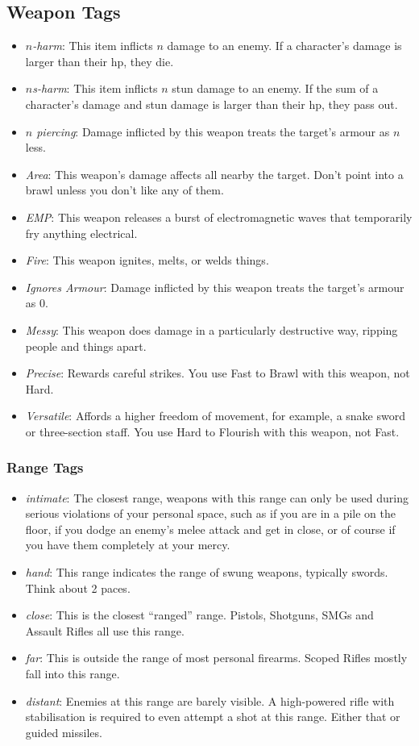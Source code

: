 \subsection{Weapon Tags}
\begin{itemize}
\item \textit{$n$-harm}: This item inflicts $n$ damage to an enemy. If a character's damage is larger than their hp, they die.
\item \textit{$n$s-harm}: This item inflicts $n$ stun damage to an enemy. If the sum of a character's damage and stun damage is larger than their hp, they pass out.
\item \textit{$n$ piercing}: Damage inflicted by this weapon treats the target's armour as $n$ less. 
\item \textit{Area}: This weapon's damage affects all nearby the target. Don't point into a brawl unless you don't like any of them.
\item \textit{EMP}: This weapon releases a burst of electromagnetic waves that temporarily fry anything electrical.
\item \textit{Fire}: This weapon ignites, melts, or welds things.
\item \textit{Ignores Armour}: Damage inflicted by this weapon treats the target's armour as 0. 
\item \textit{Messy}: This weapon does damage in a particularly destructive way, ripping people and things apart.
\item \textit{Precise}: Rewards careful strikes. You use Fast to Brawl with this weapon, not Hard.
\item \textit{Versatile}: Affords a higher freedom of movement, for example, a snake sword or three-section staff. You use Hard to Flourish with this weapon, not Fast.
\end{itemize}

\subsubsection{Range Tags}
\begin{itemize}
\item \textit{intimate}: The closest range, weapons with this range can only be used during serious violations of your personal space, such as if you are in a pile on the floor, if you dodge an enemy's melee attack and get in close, or of course if you have them completely at your mercy.
\item \textit{hand}: This range indicates the range of swung weapons, typically swords. Think about 2 paces.
\item \textit{close}: This is the closest ``ranged'' range. Pistols, Shotguns, SMGs and Assault Rifles all use this range.
\item \textit{far}: This is outside the range of most personal firearms. Scoped Rifles mostly fall into this range.
\item \textit{distant}: Enemies at this range are barely visible. A high-powered rifle with stabilisation is required to even attempt a shot at this range. Either that or guided missiles.
\end{itemize}

